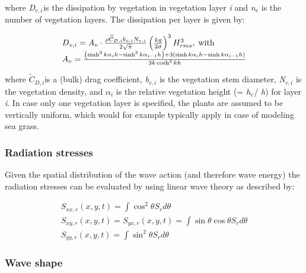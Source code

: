 \documentclass{article}
\begin{document}
\noindent where \textit{D${}_{v,i}$}${}_{ }$is the dissipation by vegetation in vegetation layer \textit{i} and \textit{n${}_{v}$} is the number of vegetation layers. The dissipation per layer is given by:

\noindent 
\begin{equation} \label{2.25)} 
\begin{array}{l} {D_{v,i} =A_{v} \cdot \frac{\rho \widetilde{C}_{D,i} b_{v,i} N_{v,i} }{2\sqrt{\pi } } \left(\frac{kg}{2\sigma } \right)^{3} H_{rms} ^{3} ,{\rm \; with}} \\ {A_{v} =\frac{\left(\sinh ^{3} k\alpha _{i} h-\sinh ^{3} k\alpha _{i-1} h\right)+3\left(\sinh k\alpha _{i} h-\sinh k\alpha _{i-1} h\right)}{3k\cosh ^{3} kh} } \end{array} 
\end{equation} 


\noindent where $\widetilde{C}_{D,i} $is a (bulk) drag coefficient, \textit{b${}_{v,i}$} is the vegetation stem diameter, \textit{N${}_{v,i}$} is the vegetation density, and \textit{$\alpha $${}_{i}$} is the relative vegetation height (= \textit{h${}_{v}$}${}_{ }$/ \textit{h}) for layer \textit{i}. In case only one vegetation layer is specified, the plants are assumed to be vertically uniform, which would for example typically apply in case of modeling sea grass.


\subsubsection{ Radiation stresses}

\noindent Given the spatial distribution of the wave action (and therefore wave energy) the radiation stresses can be evaluated by using linear wave theory as described by:

\noindent 
\begin{equation} \label{2.26)} 
\begin{array}{l} {S_{xx,r} (x,y,t)=\int \cos ^{2} \theta S_{r} d\theta  } \\ {S_{xy,r} (x,y,t)=S_{yx,r} (x,y,t)=\int \sin \theta \cos \theta S_{r}  d\theta } \\ {S_{yy,r} (x,y,t)=\int \sin ^{2} \theta S_{r} d\theta  } \end{array} 
\end{equation} 


\subsubsection{ Wave shape}
\end{document}
